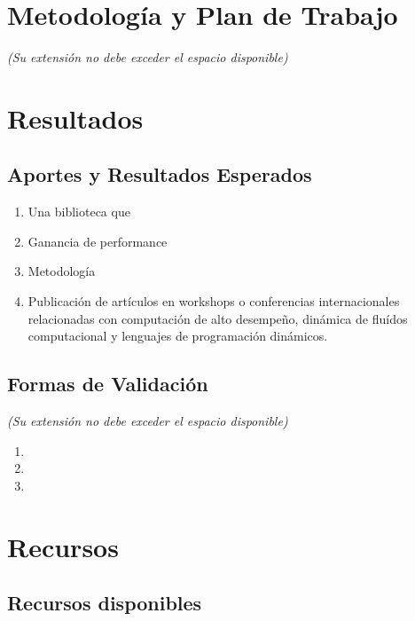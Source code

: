 \documentclass[11pt,spanish]{article}
\begin{document}
\newpage
\section{Metodología y Plan de Trabajo}
\emph{(Su extensión no debe exceder el espacio disponible)}

 \newpage
\section{Resultados}

\subsection{Aportes y Resultados Esperados}

\begin{enumerate}
    \item Una biblioteca que 
    \item Ganancia de performance
    \item Metodología
    \item Publicación de artículos en workshops o conferencias internacionales
        relacionadas con computación de alto desempeño, dinámica de fluídos
        computacional y lenguajes de programación dinámicos.
\end{enumerate}
 

\subsection{Formas de Validación}

\emph{(Su extensión no debe exceder el espacio disponible)}

\begin{enumerate}
    \item
    \item
    \item
\end{enumerate}
 

\section{Recursos}

\subsection{Recursos disponibles}

\end{document}
